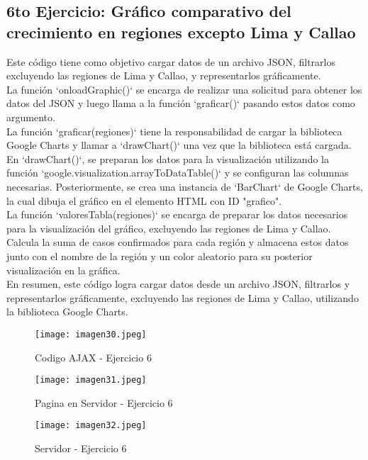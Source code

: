 \documentclass[10pt, a4paper]{article}
\begin{document}
	\subsection*{6to Ejercicio: Gráfico comparativo del crecimiento en regiones excepto Lima y Callao} 
	\begin{flushleft}
		Este código tiene como objetivo cargar datos de un archivo JSON, filtrarlos excluyendo las regiones de Lima y Callao, y representarlos gráficamente. \\
		La función `onloadGraphic()` se encarga de realizar una solicitud para obtener los datos del JSON y luego llama a la función `graficar()` pasando estos datos como argumento.\\	
		La función `graficar(regiones)` tiene la responsabilidad de cargar la biblioteca Google Charts y llamar a `drawChart()` una vez que la biblioteca está cargada. En `drawChart()`, se preparan los datos para la visualización utilizando la función `google.visualization.arrayToDataTable()` y se configuran las columnas necesarias. Posteriormente, se crea una instancia de `BarChart` de Google Charts, la cual dibuja el gráfico en el elemento HTML con ID "grafico".	\\
		La función `valoresTabla(regiones)` se encarga de preparar los datos necesarios para la visualización del gráfico, excluyendo las regiones de Lima y Callao. Calcula la suma de casos confirmados para cada región y almacena estos datos junto con el nombre de la región y un color aleatorio para su posterior visualización en la gráfica. \\	
		En resumen, este código logra cargar datos desde un archivo JSON, filtrarlos y representarlos gráficamente, excluyendo las regiones de Lima y Callao, utilizando la biblioteca Google Charts.
	\end{flushleft}
	\begin{figure}[h]
		\centering
		\texttt{[image: imagen30.jpeg]}
		\caption{Codigo AJAX - Ejercicio 6}
	\end{figure}
	\begin{figure}[h]
		\centering
		\texttt{[image: imagen31.jpeg]}
		\caption{Pagina en Servidor - Ejercicio 6}
	\end{figure}
	\begin{figure}[h]
		\centering
		\texttt{[image: imagen32.jpeg]}
		\caption{Servidor - Ejercicio 6}
	\end{figure}
		\vspace*{50cm}
\end{document}
